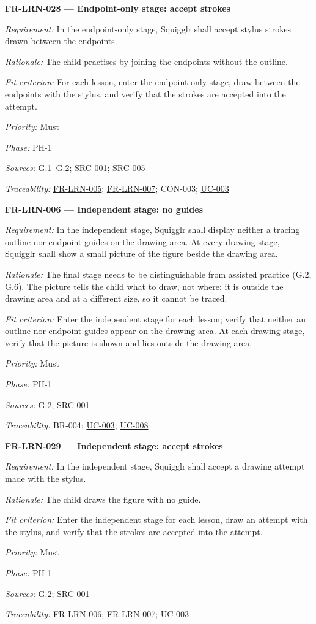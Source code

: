 \documentclass[12pt]{article}
\renewcommand{\_}{\textunderscore\allowbreak}%
\newcommand{\goalref}[1]{\hyperref[goal:#1]{G.#1}}
\newcommand{\ucref}[1]{\hyperref[uc:#1]{\mbox{UC-#1}}}
\newenvironment{srsrequirement}[2]{%
  \par\medskip\noindent\phantomsection\label{req:#1}%
  \textbf{#1 --- #2}\par\nobreak\smallskip }{\par\medskip}
\newcommand{\reqfield}[2]{\noindent\textit{#1:} #2\par}
\newcommand{\reqshall}[1]{\reqfield{Requirement}{#1}}
\newcommand{\reqrationale}[1]{\reqfield{Rationale}{#1}}
\newcommand{\reqfit}[1]{\reqfield{Fit criterion}{#1}}
\newcommand{\reqpriority}[1]{\reqfield{Priority}{#1}}
\newcommand{\reqphase}[1]{\reqfield{Phase}{#1}}
\newcommand{\reqsources}[1]{\reqfield{Sources}{#1}}
\newcommand{\reqtraces}[1]{\reqfield{Traceability}{#1}}
\newcommand{\reqref}[1]{\hyperref[req:#1]{#1}}
\newcommand{\srcref}[1]{\hyperref[src:#1]{SRC-#1}}
\providecommand{\ucref}[1]{\hyperref[uc:#1]{UC-#1}}
\begin{document}
\begin{srsrequirement}{FR-LRN-028}{Endpoint-only stage: accept strokes}
  \reqshall{In the endpoint-only stage, Squigglr shall accept stylus strokes
drawn between the endpoints.} \reqrationale{The child practises by joining the
endpoints without the outline.} \reqfit{For each lesson, enter the
endpoint-only stage, draw between the endpoints with the stylus, and verify that
the strokes are accepted into the attempt.}
  \reqpriority{Must}
  \reqphase{PH-1}
  \reqsources{\goalref{1}--\goalref{2}; \srcref{001}; \srcref{005}}
  \reqtraces{\reqref{FR-LRN-005}; \reqref{FR-LRN-007}; CON-003; \ucref{003}}
\end{srsrequirement}

\begin{srsrequirement}{FR-LRN-006}{Independent stage: no guides}
  \reqshall{In the independent stage, Squigglr shall display neither a tracing
outline nor endpoint guides on the drawing area. At every drawing stage,
Squigglr shall show a small picture of the figure beside the drawing area.}
\reqrationale{The final stage needs to be distinguishable from assisted practice
(G.2, G.6). The picture tells the child what to draw, not where: it is outside
the drawing area and at a different size, so it cannot be traced.} \reqfit{Enter
the independent stage for each lesson; verify that neither an outline nor
endpoint guides appear on the drawing area. At each drawing stage, verify that
the picture is shown and lies outside the drawing area.}
  \reqpriority{Must}
  \reqphase{PH-1}
  \reqsources{\goalref{2}; \srcref{001}} \reqtraces{BR-004; \ucref{003};
  \ucref{008}}
\end{srsrequirement}

\begin{srsrequirement}{FR-LRN-029}{Independent stage: accept strokes}
  \reqshall{In the independent stage, Squigglr shall accept a drawing attempt
made with the stylus.} \reqrationale{The child draws the figure with no guide.}
\reqfit{Enter the independent stage for each lesson, draw an attempt with the
stylus, and verify that the strokes are accepted into the attempt.}
  \reqpriority{Must}
  \reqphase{PH-1}
  \reqsources{\goalref{2}; \srcref{001}}
  \reqtraces{\reqref{FR-LRN-006}; \reqref{FR-LRN-007}; \ucref{003}}
\end{srsrequirement}
\end{document}
